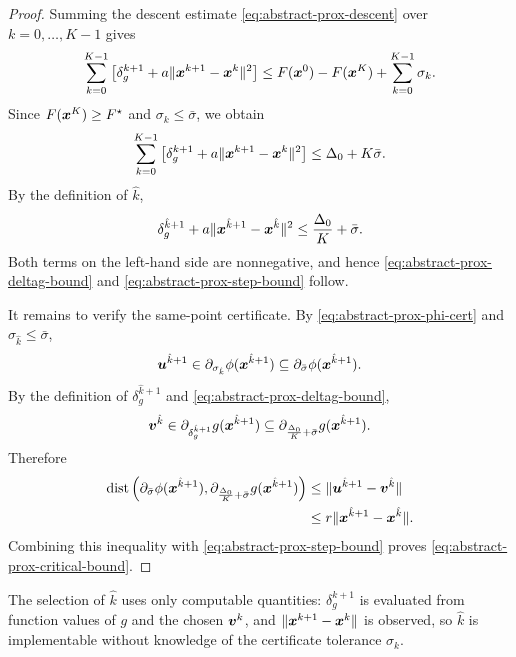 \begin{proof}
Summing the descent estimate \eqref{eq:abstract-prox-descent} over
$k=0,\ldots,K-1$ gives
\[
    \sum_{k=0}^{K-1}
    \left[
        \delta_g^{k+1}
        +
        a\|\bm{x}^{k+1}-\bm{x}^k\|^2
    \right]
    \le
    F(\bm{x}^0)-F(\bm{x}^K)+\sum_{k=0}^{K-1}\sigma_k .
\]
Since $F(\bm{x}^K)\ge F^\star$ and $\sigma_k\le\bar\sigma$, we obtain
\begin{equation}
    \sum_{k=0}^{K-1}
    \left[
        \delta_g^{k+1}
        +
        a\|\bm{x}^{k+1}-\bm{x}^k\|^2
    \right]
    \le
    \Delta_0+K\bar\sigma .
    \label{eq:abstract-prox-telescope}
\end{equation}
By the definition of $\hat k$,
\[
    \delta_g^{\hat k+1}
    +
    a\|\bm{x}^{\hat k+1}-\bm{x}^{\hat k}\|^2
    \le
    \frac{\Delta_0}{K}+\bar\sigma .
\]
Both terms on the left-hand side are nonnegative, and hence
\eqref{eq:abstract-prox-deltag-bound} and
\eqref{eq:abstract-prox-step-bound} follow.

It remains to verify the same-point certificate. By
\eqref{eq:abstract-prox-phi-cert} and $\sigma_{\hat k}\le\bar\sigma$,
\[
    \bm{u}^{\hat k+1}
    \in
    \partial_{\sigma_{\hat k}}\phi(\bm{x}^{\hat k+1})
    \subseteq
    \partial_{\bar\sigma}\phi(\bm{x}^{\hat k+1}).
\]
By the definition of $\delta_g^{\hat k+1}$ and
\eqref{eq:abstract-prox-deltag-bound},
\[
    \bm{v}^{\hat k}
    \in
    \partial_{\delta_g^{\hat k+1}}g(\bm{x}^{\hat k+1})
    \subseteq
    \partial_{\frac{\Delta_0}{K}+\bar\sigma}g(\bm{x}^{\hat k+1}).
\]
Therefore
\[
\begin{aligned}
    \operatorname{dist}
    \left(
        \partial_{\bar\sigma}\phi(\bm{x}^{\hat k+1}),
        \partial_{\frac{\Delta_0}{K}+\bar\sigma}g(\bm{x}^{\hat k+1})
    \right)
    &\le
    \|\bm{u}^{\hat k+1}-\bm{v}^{\hat k}\|
    \\
    &\le
    r\|\bm{x}^{\hat k+1}-\bm{x}^{\hat k}\| .
\end{aligned}
\]
Combining this inequality with \eqref{eq:abstract-prox-step-bound}
proves \eqref{eq:abstract-prox-critical-bound}.
\end{proof}

The selection of $\hat k$ uses only computable quantities:
$\delta_g^{k+1}$ is evaluated from function values of $g$ and the
chosen $\bm{v}^k$, and $\|\bm{x}^{k+1}-\bm{x}^k\|$ is observed, so $\hat k$ is
implementable without knowledge of the certificate tolerance
$\sigma_k$.

